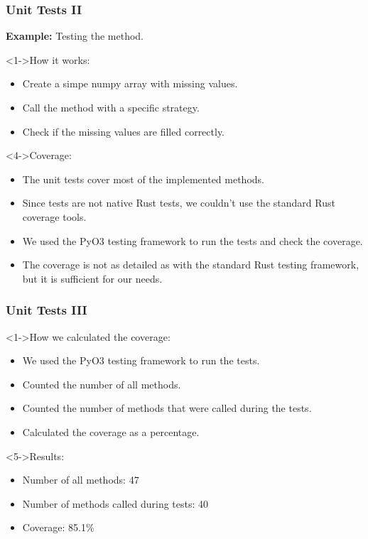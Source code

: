 \documentclass[t,english]{beamer}
\begin{document}
\begin{frame}
  \frametitle{Unit Tests II}
  \textbf{Example:} Testing the \impute method.

  \begin{block}<1->{How it works:}
    \begin{itemize}
      \item<1-> Create a simpe numpy array with missing values.
      \item<2-> Call the \impute method with a specific strategy.
      \item<3-> Check if the missing values are filled correctly.
    \end{itemize}
  \end{block}

    \begin{block}<4->{Coverage:}
        \begin{itemize}
        \item <4-> The unit tests cover most of the implemented methods.
        \item <5-> Since tests are not native Rust tests, we couldn't use the standard Rust coverage tools.
        \item <6-> We used the PyO3 testing framework to run the tests and check the coverage.
        \item <7-> The coverage is not as detailed as with the standard Rust testing framework, but it is sufficient for our needs.
        \end{itemize}
    \end{block}

\end{frame}

\begin{frame}
    \frametitle{Unit Tests III}
    \begin{block}<1->{How we calculated the coverage:}
        \begin{itemize}
        \item<1-> We used the PyO3 testing framework to run the tests.
        \item<2-> Counted the number of all methods.
        \item <3-> Counted the number of methods that were called during the tests.
        \item <4-> Calculated the coverage as a percentage.
        \end{itemize}
    \end{block}

    \begin{block}<5->{Results:}
        \begin{itemize}
        \item<5-> Number of all methods: 47
        \item <6-> Number of methods called during tests: 40
        \item <7-> Coverage: 85.1\%
        \end{itemize}
    \end{block}
\end{frame}
\end{document}
